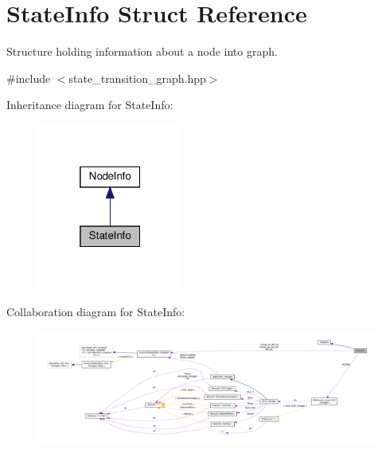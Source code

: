 \hypertarget{structStateInfo}{}\section{State\+Info Struct Reference}
\label{structStateInfo}


Structure holding information about a node into graph.  




{\ttfamily \#include $<$state\+\_\+transition\+\_\+graph.\+hpp$>$}



Inheritance diagram for State\+Info\+:
\nopagebreak
\begin{figure}[H]
\begin{center}
\leavevmode
\includegraphics[width=136pt]{d4/da4/structStateInfo__inherit__graph}
\end{center}
\end{figure}


Collaboration diagram for State\+Info\+:
\nopagebreak
\begin{figure}[H]
\begin{center}
\leavevmode
\includegraphics[width=350pt]{db/de1/structStateInfo__coll__graph}
\end{center}
\end{figure}
